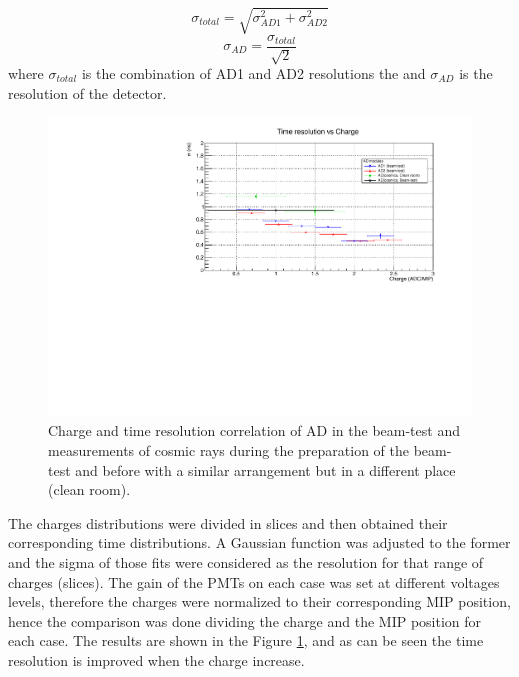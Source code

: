 	\begin{equation}
	\sigma_{total}=\sqrt{\sigma^2_{AD1}+\sigma^2_{AD2}}
	\end{equation}
	\begin{equation}
	\sigma_{AD}=\frac{\sigma_{total}}{\sqrt{2}}
	\end{equation}
	where $\sigma_{total}$ is the combination of AD1 and AD2 resolutions the and $\sigma_{AD}$  is the resolution 
	of the detector.
	
	\begin{figure}[hb!]
		\begin{center}
	\includegraphics[scale=0.70]{images/time/RestVsCharge-Note_ext.pdf}%
			\caption{Charge and time resolution correlation of AD in the beam-test and 
				measurements of cosmic rays during the preparation of the beam-test and before with a similar arrangement but in a different place (clean room).}
			\label{figure:ResCompareExt}
		\end{center}
	\end{figure}
	
	The charges distributions were divided in slices and then obtained their corresponding time distributions. A Gaussian function was adjusted to the former and the sigma of those fits were considered as the resolution for that range of charges (slices). The gain of the PMTs on each case was set at different voltages levels, therefore the charges were normalized to their corresponding MIP position, hence the comparison was done dividing the charge and the MIP position for each case. The results are shown in the Figure \ref{figure:ResCompareExt}, and as can be seen the time resolution is improved when the charge increase.
	
